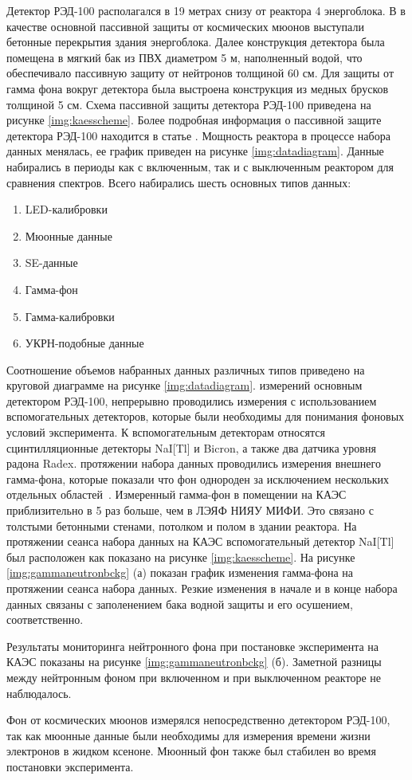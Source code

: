 Детектор РЭД-100 располагался в 19 метрах снизу от реактора 4 энергоблока. В в качестве основной пассивной защиты от космических мюонов выступали бетонные перекрытия здания энергоблока. Далее конструкция детектора была помещена в мягкий бак из ПВХ диаметром 5 м, наполненный водой, что обеспечивало пассивную защиту от нейтронов толщиной 60 см. Для защиты от гамма фона вокруг детектора была выстроена конструкция из медных брусков толщиной 5 см. Схема пассивной защиты детектора РЭД-100 приведена на рисунке \ref{img:kaesscheme}. Более подробная информация о пассивной защите детектора РЭД-100 находится в статье \cite{shielding}.
Мощность реактора в процессе набора данных менялась, ее график приведен на рисунке \ref{img:datadiagram}.  Данные набирались в периоды как с включенным, так и с выключенным реактором для сравнения спектров. 
	Всего набирались шесть основных типов данных:
 \begin{enumerate}
     \item LED-калибровки
     \item Мюонные данные
     \item SE-данные
     \item Гамма-фон
     \item Гамма-калибровки
     \item УКРН-подобные данные
 \end{enumerate}
Соотношение объемов набранных данных различных типов приведено на круговой диаграмме на рисунке \ref{img:datadiagram}.
 измерений основным детектором РЭД-100, непрерывно проводились измерения с использованием вспомогательных детекторов, которые были необходимы для понимания фоновых условий эксперимента. К вспомогательным детекторам относятся сцинтилляционные детекторы NaI[Tl] и Bicron, а также два датчика уровня радона Radex.
 протяжении набора данных проводились измерения внешнего гамма-фона, которые показали что фон однороден за исключением нескольких отдельных областей~\cite{The_RED100_Experiment}. Измеренный гамма-фон в помещении на КАЭС приблизительно в 5 раз больше, чем в ЛЭЯФ НИЯУ МИФИ. Это связано с толстыми бетонными стенами, потолком и полом в здании реактора.  На протяжении сеанса набора данных на КАЭС вспомогательный детектор NaI[Tl] был расположен как показано на рисунке \ref{img:kaesscheme}. На рисунке \ref{img:gammaneutronbckg} (а) показан график изменения гамма-фона на протяжении сеанса набора данных. Резкие изменения в начале и в конце набора данных связаны с заполенением бака водной защиты и его осушением, соответственно.
\par Результаты мониторинга нейтронного фона при постановке эксперимента на КАЭС показаны на рисунке \ref{img:gammaneutronbckg} (б). Заметной разницы между нейтронным фоном при включенном и при выключенном реакторе не наблюдалось. 
\par Фон от космических мюонов измерялся непосредственно детектором РЭД-100, так как мюонные данные были необходимы для измерения времени жизни электронов в жидком ксеноне. Мюонный фон также был стабилен во время постановки эксперимента. 

